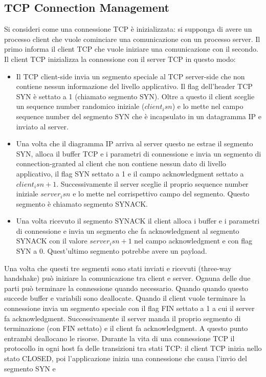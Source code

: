 \subsection{TCP Connection Management}
Si consideri come una connessione TCP \`e inizializzata: si supponga di avere un processo client che vuole cominciare una comunicazione con un processo 
server. Il primo informa il client TCP che vuole iniziare una comunicazione con il secondo. Il client TCP inizializza la connessione con il server TCP in
questo modo:
\begin{itemize}
\item Il TCP client-side invia un segmento speciale al TCP server-side che non contiene nessun informazione del livello applicativo. Il flag dell'header TCP
SYN \`e settato a 1 (chiamato segmento SYN). Oltre a questo il client sceglie un sequence number randomico iniziale ($client_isn$) e lo mette nel campo 
sequence number del segmento SYN che \`e incapsulato in un datagramma IP e inviato al server. 
\item Una volta che il diagramma IP arriva al server questo ne estrae il segmento SYN, alloca il buffer TCP e i parametri di connessione e invia un segmento
di connection-granted al client che non contiene nessun dato di livello applicativo, il flag SYN settato a 1 e il campo acknowledgment settato a 
$client_isn+1$. Successivamente il server sceglie il proprio sequence number iniziale $server_isn$ e lo mette nel corrispettivo campo del segmento. Questo
segmento \`e chiamato segmento SYNACK.
\item Una volta ricevuto il segmento SYNACK il client alloca i buffer e i parametri di connessione e invia un segmento che fa acknowledgment al segmento 
SYNACK con il valore $server_isn+1$ nel campo acknowledgment e con flag SYN a 0. Quest'ultimo segmento potrebbe avere un payload. 
\end{itemize}
Una volta che questi tre segmenti sono stati inviati e ricevuti (three-way handshake) pu\`o iniziare la comunicazione tra client e server. Ognuna delle due
parti pu\`o terminare la connessione quando necessario. Quando quando questo succede buffer e variabili sono deallocate. Quando il client vuole terminare la
connessione invia un segmento speciale con il flag FIN settato a 1 a cui il server fa acknowledgment. Successivamente il server manda il proprio segmento di 
terminazione (con FIN settato) e il client fa acknowledgment. A questo punto entrambi deallocano le risorse. Durante la vita di una connessione TCP il protocollo in ogni host
fa delle transizioni tra stati TCP: il client TCP inizia nello stato CLOSED, poi l'applicazione inizia una connessione che causa l'invio del segmento SYN e 
